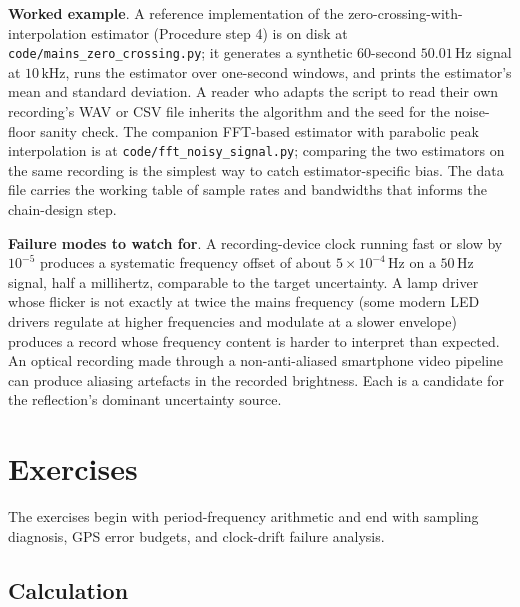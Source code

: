\begin{project}
\textbf{Worked example}. A reference implementation of the
zero-crossing-with-interpolation estimator (Procedure step 4) is on
disk at \texttt{code/mains\_zero\_crossing.py}; it generates a
synthetic 60-second $50.01 \,\si{\hertz}$ signal at $10 \,\si
{\kilo\hertz}$, runs the estimator over one-second windows, and
prints the estimator's mean and standard deviation. A reader who
adapts the script to read their own recording's WAV or CSV file
inherits the algorithm and the seed for the noise-floor sanity
check. The companion FFT-based estimator with parabolic peak
interpolation is at \texttt{code/fft\_noisy\_signal.py}; comparing
the two estimators on the same recording is the simplest way to
catch estimator-specific bias. The data file
 carries the working table of
sample rates and bandwidths that informs the chain-design step.

\textbf{Failure modes to watch for}. A recording-device clock
running fast or slow by $10^{-5}$ produces a systematic frequency
offset of about $5 \times 10^{-4} \,\si{\hertz}$ on a $50 \,\si
{\hertz}$ signal, half a millihertz, comparable to the target
uncertainty. A lamp driver whose flicker is not exactly at twice
the mains frequency (some modern LED drivers regulate at higher
frequencies and modulate at a slower envelope) produces a record
whose frequency content is harder to interpret than expected. An
optical recording made through a non-anti-aliased smartphone video
pipeline can produce aliasing artefacts in the recorded
brightness. Each is a candidate for the reflection's dominant
uncertainty source.
\end{project}

\section{Exercises}

The exercises begin with period-frequency arithmetic and end with
sampling diagnosis, GPS error budgets, and clock-drift failure
analysis.

\subsection*{Calculation}

